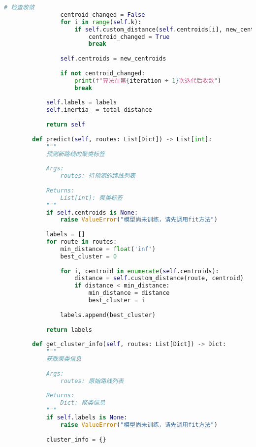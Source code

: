 \begin{lstlisting}[language=Python]
                # 检查收敛
                centroid_changed = False
                for i in range(self.k):
                    if self.custom_distance(self.centroids[i], new_centroids[i]) > self.tolerance:
                        centroid_changed = True
                        break
                
                self.centroids = new_centroids
                
                if not centroid_changed:
                    print(f"算法在第{iteration + 1}次迭代后收敛")
                    break
            
            self.labels = labels
            self.inertia_ = total_distance
            
            return self
        
        def predict(self, routes: List[Dict]) -> List[int]:
            """
            预测新路线的聚类标签
            
            Args:
                routes: 待预测的路线列表
                
            Returns:
                List[int]: 聚类标签
            """
            if self.centroids is None:
                raise ValueError("模型尚未训练，请先调用fit方法")
            
            labels = []
            for route in routes:
                min_distance = float('inf')
                best_cluster = 0
                
                for i, centroid in enumerate(self.centroids):
                    distance = self.custom_distance(route, centroid)
                    if distance < min_distance:
                        min_distance = distance
                        best_cluster = i
                
                labels.append(best_cluster)
            
            return labels
        
        def get_cluster_info(self, routes: List[Dict]) -> Dict:
            """
            获取聚类信息
            
            Args:
                routes: 原始路线列表
                
            Returns:
                Dict: 聚类信息
            """
            if self.labels is None:
                raise ValueError("模型尚未训练，请先调用fit方法")
            
            cluster_info = {}
            

\end{lstlisting}

